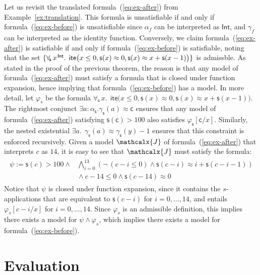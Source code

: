 \documentclass[runningheads,a4paper]{llncs}
\newcommand{\con}[1]{\mathsf{#1}}
\let\oldneg=\neg
\def\neg{\oldneg\:}
\let\oldwedge=\wedge
\def\wedge{\mathrel{\oldwedge}}
\newcommand{\teq}{\approx}
\newcommand{\I}{\mathcalx{J}} %
\newcommand{\sortint}{\ty{Int}}
\newcommand\ty[1]{\con{#1}}
\newcommand{\lite}{\con{ite}}
\newcommand\concret{\gamma} %
\newcommand{\forallf}[1]{\forall_{\!#1\:}}
\newcommand{\farg}[1]{\concret_{#1}}
\newcommand{\fargsort}[1]{\alpha_{#1}}
\newcommand{\vthinspace}{\kern+0.083333em}
\newcommand{\typ}[1]{^{\vthinspace #1}}
\begin{document}
Let us revisit the translated formula~(\ref{eq:ex-after}) from Example~\ref{ex:translation}.
This formula is unsatisfiable if and only if formula~(\ref{eq:ex-before}) is unsatisfiable since $\fargsort{f}$ can be interpreted as $\sortint$,
and $\farg{f}$ can be interpreted as the identity function.
Conversely, we claim formula~(\ref{eq:ex-after}) is satisfiable if and only if formula~(\ref{eq:ex-before}) is satisfiable,
noting that the set $\{ \forallf{\con{s}} x\typ{\sortint}.\;\, \lite\bigl( x \leq 0, \con{s}(x) \teq 0, \con{s}( x ) \teq x + \con{s}( x-1 ) \bigr) \}$ is admissble.
As stated in the proof of the previous theorem, 
the reason is that any model of formula~(\ref{eq:ex-after}) must satisfy a formula that is closed under function expansion,
hence implying that formula~(\ref{eq:ex-before}) has a model.
In more detail, let $\varphi_s$ be the formula $\forallf{\con{s}} x.\;\, \lite\bigl( x \leq 0, \con{s}(x) \teq 0, \con{s}( x ) \teq x + \con{s}( x-1 ) \bigr)$.
The rightmost conjunct 
$\exists a : {\fargsort{\con{s}}}. \farg{\con{s}}( a ) \teq \con{c}$ ensures 
that any model of formula~(\ref{eq:ex-after}) satisfying $\con{s}( \con{c} ) > 100$ also satisfies $\varphi_{\con{s}}[\con{c}/x]$.
Similarly, the nested existential $\exists a.\;\, \farg{\con{s}}( a ) \teq \farg{\con{s}}( y )-1$
ensures that this constraint is enforced recursively.
Given a model $\I$ of formula~(\ref{eq:ex-after}) that interprets $c$ as $14$, 
it is easy to see that $\I$ must satisfy the formula:
\begin{eqnarray} \label{eq:fun-closure}
\begin{split}
\psi := \con{s}( c ) > 100 \wedge & \displaystyle\bigwedge\limits_{i=0}^{13} ( \neg (c-i \leq 0) \wedge \con{s}( c-i ) \teq i + \con{s}( c-i-1 ) ) \\
                            & \wedge c-14 \leq 0 \wedge \con{s}( c-14 ) \teq 0
\end{split}
\end{eqnarray}
Notice that $\psi$ is closed under function expansion, 
since it contains the $s$-applications that are equivalent to $\con{s}( c-i )$ for $i = 0, \ldots, 14$, and
entails $\varphi_s[c-i/x]$ for $i = 0, \ldots, 14$.
Since $\varphi_s$ is an admissible definition,
this implies there exists a model for $\psi \wedge \varphi_s$,
which implies there exists a model for formula~(\ref{eq:ex-before}).

\section{Evaluation}
\label{sec:evaluation}
\end{document}
